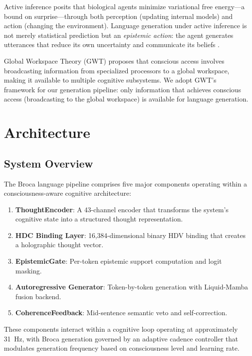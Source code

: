 \documentclass[12pt,a4paper]{article}
\begin{document}
Active inference \citep{friston2010free} posits that biological agents minimize variational free energy---a bound on surprise---through both perception (updating internal models) and action (changing the environment). Language generation under active inference is not merely statistical prediction but an \emph{epistemic action}: the agent generates utterances that reduce its own uncertainty and communicate its beliefs \citep{friston2010free}.

Global Workspace Theory (GWT) \citep{baars1988cognitive, dehaene2014consciousness} proposes that conscious access involves broadcasting information from specialized processors to a global workspace, making it available to multiple cognitive subsystems. We adopt GWT's framework for our generation pipeline: only information that achieves conscious access (broadcasting to the global workspace) is available for language generation.

\section{Architecture}

\subsection{System Overview}

The Broca language pipeline comprises five major components operating within a consciousness-aware cognitive architecture:

\begin{enumerate}
    \item \textbf{ThoughtEncoder}: A 43-channel encoder that transforms the system's cognitive state into a structured thought representation.
    \item \textbf{HDC Binding Layer}: 16,384-dimensional binary HDV binding that creates a holographic thought vector.
    \item \textbf{EpistemicGate}: Per-token epistemic support computation and logit masking.
    \item \textbf{Autoregressive Generator}: Token-by-token generation with Liquid-Mamba fusion backend.
    \item \textbf{CoherenceFeedback}: Mid-sentence semantic veto and self-correction.
\end{enumerate}

These components interact within a cognitive loop operating at approximately 31~Hz, with Broca generation governed by an adaptive cadence controller that modulates generation frequency based on consciousness level and learning rate.
\end{document}
